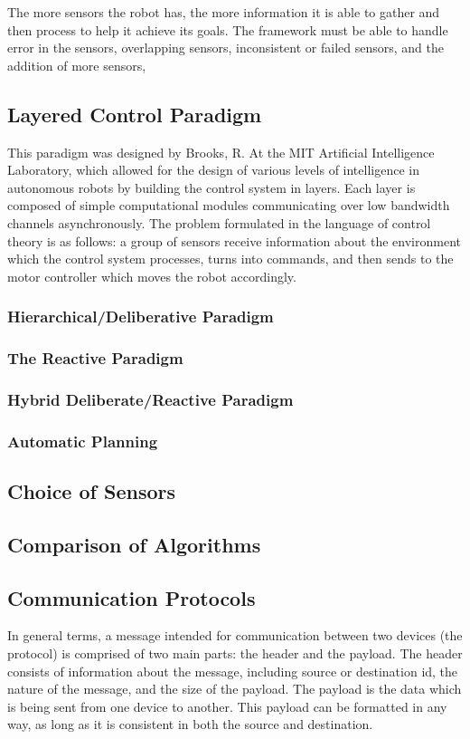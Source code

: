 The more sensors the robot has, the more information it is able to gather and then process to help it achieve its goals. The framework must be able to handle error in the sensors, overlapping sensors, inconsistent or failed sensors, and the addition of more sensors, 

\subsection*{Layered Control Paradigm \cite{Brooks:1985}}
This paradigm was designed by Brooks, R. At the MIT Artificial Intelligence Laboratory, which allowed for the design of various levels of intelligence in autonomous robots by building the control system in layers. Each layer is composed of simple computational modules communicating over low bandwidth channels asynchronously. The problem formulated in the language of control theory is as follows: a group of sensors receive information about the environment which the control system processes, turns into commands, and then sends to the motor controller which moves the robot accordingly.

\subsubsection*{Hierarchical/Deliberative Paradigm}
\subsubsection*{The Reactive Paradigm}
\subsubsection*{Hybrid Deliberate/Reactive Paradigm}
\subsubsection*{Automatic Planning}

\subsection*{Choice of Sensors}

\subsection*{Comparison of Algorithms}

\subsection*{Communication Protocols}
In general terms, a message intended for communication between two devices (the protocol) is comprised of two main parts: the header and the payload. The header consists of information about the message, including source or destination id, the nature of the message, and the size of the payload. The payload is the data which is being sent from one device to another. This payload can be formatted in any way, as long as it is consistent in both the source and destination.

